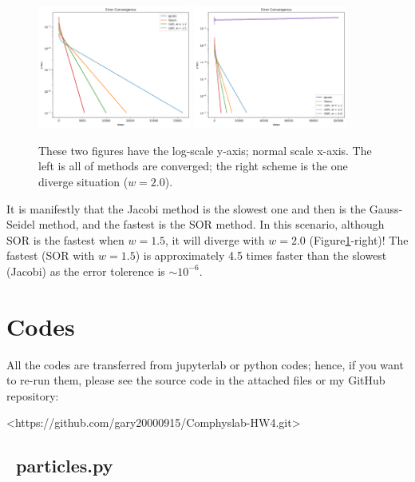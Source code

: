\documentclass[12pt]{article}
\begin{document}
    \begin{figure}[H]
        \centering
        \includegraphics[width = 0.45\textwidth]{./fig/3.1.png}
        \includegraphics[width = 0.45\textwidth]{./fig/3.2.png}
        \caption{These two figures have the log-scale y-axis; normal scale x-axis. The left is all of methods are converged; the right scheme is the one diverge situation ($w = 2.0$).}\label{q3}
    \end{figure}

    It is manifestly that the Jacobi method is the slowest one and then is the Gauss-Seidel method, and the fastest is the SOR method. In this scenario, although SOR is the fastest when $w = 1.5$, it will diverge with $w = 2.0$ (Figure\ref{q3}-right)! The fastest (SOR with $w = 1.5$) is approximately 4.5 times faster than the slowest (Jacobi) as the error tolerence is $\sim 10^{-6}$.


\section{Codes}
    All the codes are transferred from jupyterlab or python codes; hence, if you want to re-run them, please see the source code in the attached files or my GitHub repository:

    {\centerline{\ttfamily <https://github.com/gary20000915/Comphyslab-HW4.git>}}

    \subsection{{\ttfamily\ particles.py}}
        \begin{lstlisting}[language={Python}]
        
        \end{lstlisting}
\end{document}
